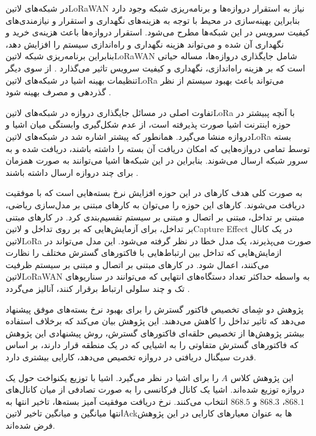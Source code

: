 
در شبکه‌های ‌لاتین{LoRaWAN} نیاز به استقرار دروازه‌ها و برنامه‌ریزی شبکه وجود دارد بنابراین بهینه‌سازی در محیط با توجه به هزینه‌های نگهداری و استقرار و نیازمندی‌های کیفیت سرویس
در این شبکه‌ها مطرح می‌شود. استقرار دروازه‌ها باعث هزینه‌ی خرید و نگهداری آن شده و می‌تواند هزینه نگهداری و راه‌اندازی سیستم را افزایش دهد،
بنابراین برنامه‌ریزی شبکه ‌لاتین{LoRaWAN} شامل جایگذاری دروازه‌ها، مساله حیاتی است که بر هزینه راه‌اندازی، نگهداری و کیفیت سرویس تاثیر می‌گذارد
.
از سوی دیگر تنظیمات بهینه اشیا در شبکه‌های ‌لاتین{LoRa} می‌تواند باعث بهبود سیستم از نظر گذردهی و مصرف بهینه شود
.

تفاوت اصلی در مسائل جایگذاری دروازه در شبکه‌های ‌لاتین{LoRa} با آنچه پبیشتر در حوزه اینترنت اشیا صورت پذیرفته است،
از عدم شکل‌گیری وابستگی میان اشیا و دروازه منشا می‌گیرد. همانطور که پیشتر اشاره شد در شبکه‌های ‌لاتین{LoRa}
بسته توسط تمامی دروازه‌هایی که امکان دریافت آن بسته را داشته باشند، دریافت شده و به سرور شبکه ارسال می‌شوند.
بنابراین در این شبکه‌ها اشیا می‌توانند به صورت همزمان برای چند دروازه ارسال داشته باشند
.

به صورت کلی هدف کارهای در این حوزه افزایش نرخ بسته‌هایی است که با موفقیت دریافت می‌شوند.
کارهای این حوزه را می‌توان به کارهای مبتنی بر مدل‌سازی ریاضی، مبتنی بر تداخل، مبتنی بر اتصال
و مبتنی بر سیستم تقسیم‌بندی کرد.
در کارهای مبتنی بر تداخل،
برای آزمایش‌هایی که بر روی تداخل و ‌لاتین{Capture Effect}
در یک کانال ‌لاتین{LoRa} صورت می‌پذیرند، یک مدل خطا در نظر گرفته می‌شود.
این مدل می‌تواند در ازمایش‌هایی که تداخل بین ارتباط‌هایی با فاکتورهای گسترش مختلف را نظارت می‌کنند،
اعمال شود.
در کارهای مبتنی بر اتصال و مبتنی بر سیستم ظرفیت ‌لاتین{LoRaWAN} به واسطه حداکثر تعداد
دستگاه‌های انتهایی که می‌توانند در سناریوهای تک و چند سلولی ارتباط برقرار کنند، آنالیز می‌گردد
.


پژوهش  دو شِمای تخصیص فاکتور گسترش را برای بهبود نرخ بسته‌های موفق پیشنهاد می‌دهد
که تاثیر تداخل را کاهش می‌دهند.
این پژوهش بیان می‌کند که برخلاف استفاده بیشتر پژوهش‌ها از تخصیص حلقه‌ای فاکتورهای گسترش، روش پیشنهادی این
پژوهش که فاکتورهای گسترش متفاوتی را به اشیایی که در یک منطقه قرار دارند، بر اساس قدرت سیگنال دریافتی در دروازه
تخصیص می‌دهد، کارایی بیشتری دارد.

این پژوهش کلاس $A$ را برای اشیا در نظر می‌گیرد. اشیا با توزیع یکنواخت حول یک دروازه
توزیع شده‌اند. اشیا یک کانال فرکانسی را به صورت تصادفی از میان کانال‌های $868.1$، $868.3$ و $868.5$
انتخاب می‌کنند.
نرخ دریافت موفقیت آمیز بسته‌ها، تاخیر انتها به انتها میانگین و میانگین تاخیر ‌لاتین{Ack}ها
به عنوان معیارهای کارایی در این پژوهش فرض شده‌اند.

